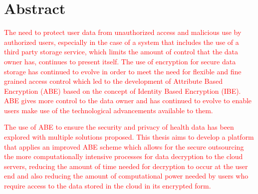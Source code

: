 \chapter*{Abstract}

\textcolor{red}{The need to protect user data from unauthorized access and malicious use by authorized users, especially in the case of a system that includes the use of a third party storage service, which limits the amount of control that the data owner has, continues to present itself. The use of encryption for secure data storage has continued to evolve in order to meet the need for flexible and fine grained access control which led to the development of Attribute Based Encryption (ABE) based on the concept of Identity Based Encryption (IBE). ABE gives more control to the data owner and has continued to evolve to enable users make use of the technological advancements available to them.}

\textcolor{red}{The use of ABE to ensure the security and privacy of health data has been explored with multiple solutions proposed. This thesis aims to develop a platform that applies an improved ABE scheme which allows for the secure outsourcing the more computationally intensive processes for data decryption to the cloud servers, reducing the amount of time needed for decryption to occur at the user end and also reducing the amount of computational power needed by users who require access to the data stored in the cloud in its encrypted form.}